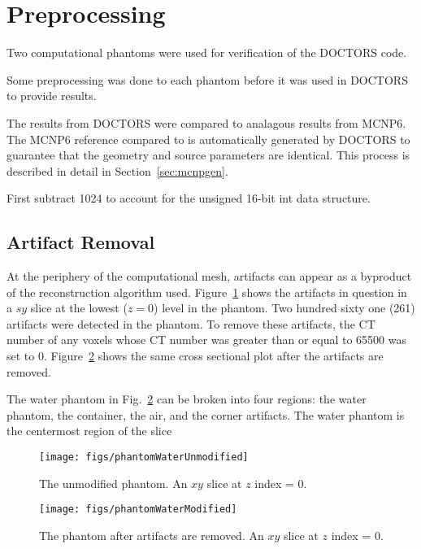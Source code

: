 

\section{Preprocessing}
Two computational phantoms were used for verification of the DOCTORS code.

Some preprocessing was done to each phantom before it was used in DOCTORS to provide results.

The results from DOCTORS were compared to analagous results from MCNP6. The MCNP6 reference compared to is automatically generated by DOCTORS to guarantee that the geometry and source parameters are identical. This process is described in detail in Section~\ref{sec:mcnpgen}.

First subtract 1024 to account for the unsigned 16-bit int data structure.

\subsection{Artifact Removal}
At the periphery of the computational mesh, artifacts can appear as a byproduct of the reconstruction algorithm used. Figure~\ref{fig:phantomWaterUnmodified} shows the artifacts in question in a $sy$ slice at the lowest ($z = 0$) level in the phantom. Two hundred sixty one (261) artifacts were detected in the phantom. To remove these artifacts, the CT number of any voxels whose CT number was greater than or equal to 65500 was set to 0. Figure~\ref{fig:phantomWaterModified} shows the same cross sectional plot after the artifacts are removed.

The water phantom in Fig.~\ref{fig:phantomWaterModified} can be broken into four regions: the water phantom, the container, the air, and the corner artifacts. The water phantom is the centermost region of the slice

\begin{figure}[tb]
  \begin{center}
   \texttt{[image: figs/phantomWaterUnmodified]}
  \end{center}
  \caption{The unmodified phantom. An $xy$ slice at $z$ index = 0.}
\label{fig:phantomWaterUnmodified}
\end{figure}

\begin{figure}[tb]
  \begin{center}
   \texttt{[image: figs/phantomWaterModified]}
  \end{center}
  \caption{The phantom after artifacts are removed. An $xy$ slice at $z$ index = 0.}
\label{fig:phantomWaterModified}
\end{figure}

